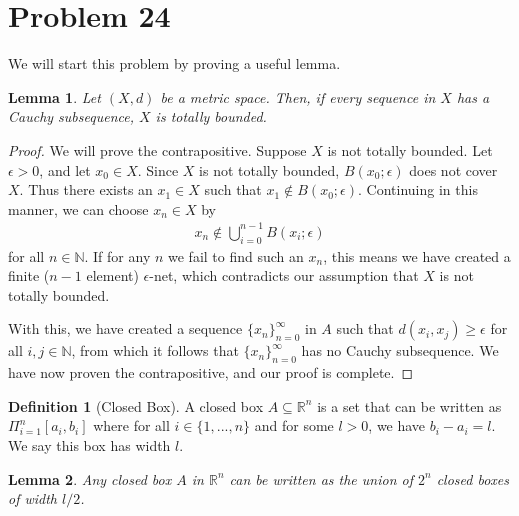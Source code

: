 \documentclass[10pt,a4paper]{article}
\author{Jeremiah Givens}
\theoremstyle{theorem}
\newtheorem{lemma}{Lemma}
\theoremstyle{definition}
\newtheorem{definition}{Definition}
\begin{document}
\section*{Problem 24}
We will start this problem by proving a useful lemma.
\begin{lemma}
Let $(X, d)$ be a metric space. Then, if every sequence in $X$ has a Cauchy subsequence, $X$ is totally bounded.
\end{lemma}

\begin{proof}
We will prove the contrapositive. Suppose $X$ is not totally bounded. Let $\epsilon > 0$, and let $x_0 \in X$. Since $X$ is not totally bounded, $B(x_0; \epsilon)$ does not cover $X$. Thus there exists an $x_1 \in X$ such that $x_1 \not \in B(x_0; \epsilon)$. Continuing in this manner, we can choose $x_n \in X$ by 
\begin{align*}
x_n \not \in \bigcup_{i = 0}^{n-1} B(x_i; \epsilon)
\end{align*}
for all $n \in \mathbb{N}$. If for any $n$ we fail to find such an $x_n$, this means we have created a finite ($n-1$ element) $\epsilon$-net, which contradicts our assumption that $X$ is not totally bounded.

With this, we have created a sequence $\{x_n \}_{n=0}^\infty$ in $A$ such that $d(x_i, x_j) \geq \epsilon$ for all $i,j \in \mathbb{N}$, from which it follows that $\{x_n \}_{n=0}^\infty$ has no Cauchy subsequence. We have now proven the contrapositive, and our proof is complete.
\end{proof}

\begin{definition}[Closed Box] 
A closed box $A \subseteq \mathbb{R}^n$ is a set that can be written as $\Pi_{i = 1}^n [a_i, b_i]$ where for all $i \in \{1,...,n\}$ and for some $l >0$, we have $b_i - a_i = l$. We say this box has width $l$.
\end{definition}

\begin{lemma}
Any closed box $A$ in $\mathbb{R}^n$ can be written as the union of $2^n$ closed boxes of width $l/2$.
\end{lemma}
\end{document}
